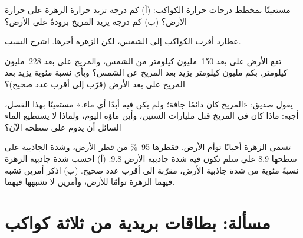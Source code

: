 \begin{exercise}[$\star\star$]\label{exo:g6:earth-a-planet:8}
مستعينًا بمخطط درجات حرارة الكواكب: (أ) كم درجة
تزيد حرارة الزهرة على حرارة الأرض؟ (ب) كم درجة يزيد المريخ برودةً على
الأرض؟
\end{exercise}

\begin{exercise}[$\star\star$]\label{exo:g6:earth-a-planet:9}
عطارد أقرب الكواكب إلى الشمس، لكن الزهرة أحرها. اشرح
السبب.
\end{exercise}

\begin{exercise}[$\star\star$]\label{exo:g6:earth-a-planet:10}
تقع الأرض على بعد 150~مليون كيلومتر من الشمس، والمريخ على بعد 228~مليون
كيلومتر. بكم مليون كيلومتر يزيد بعد المريخ عن الشمس؟ وبأي
نسبة مئوية يزيد بعد المريخ على بعد الأرض (قرّب إلى
أقرب عدد صحيح)؟
\end{exercise}

\begin{exercise}[$\star\star\star$]\label{exo:g6:earth-a-planet:11}
يقول صديق: «المريخ كان دائمًا  جافة؛ ولم يكن فيه أبدًا
أي ماء.» مستعينًا بهذا الفصل، أجبه: ماذا كان في المريخ
قبل مليارات السنين، وأين ماؤه اليوم، ولماذا لا يستطيع الماء السائل
أن يدوم على سطحه الآن؟
\end{exercise}

\begin{exercise}[$\star\star\star$]\label{exo:g6:earth-a-planet:12}
تسمى الزهرة أحيانًا توأم الأرض. فقطرها 95~\% من قطر
الأرض، وشدة الجاذبية على سطحها 8.9 على سلم تكون فيه شدة
جاذبية الأرض 9.8. (أ) احسب شدة جاذبية الزهرة نسبةً مئوية من شدة جاذبية
الأرض،
مقرّبة إلى أقرب عدد صحيح. (ب) اذكر أمرين تشبه فيهما الزهرة
توأمًا للأرض، وأمرين لا تشبهها فيهما.
\end{exercise}

\section{مسألة: بطاقات بريدية من ثلاثة كواكب}

